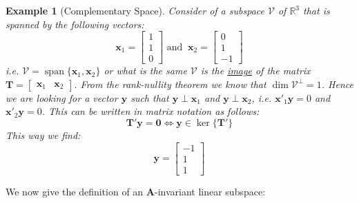 \documentclass[a4paper,10pt,oneside]{book}
\newtheorem{example}{Example}
\begin{document}
\begin{example}[Complementary Space]\label{ex:complSpace}
 Consider of a subspace $\mathcal{V}$ of $\mathbb{R}^3$ that is spanned by the following vectors:
 \begin{equation}
 \mathbf{x}_1=\left[ {\begin{array}{c}
      1\\1\\0
\end{array} } \right] \text{ and }\ \mathbf{x}_2=\left[ {\begin{array}{c}
      0\\1\\-1
\end{array} } \right]
 \end{equation}
i.e. $\mathcal{V}=\operatorname{span}\{\mathbf{x}_1,\mathbf{x}_2\}$ or what is the same $\mathcal{V}$ is the \hyperlink{def:image}{image} of the matrix $\mathbf{T}=\left[ {\begin{array}{cc}\mathbf{x}_1&\mathbf{x}_2\end{array} } \right]$. From the rank-nullity theorem we know that $\operatorname{dim}\mathcal{V}^\perp=1$. Hence we are looking for a vector $\mathbf{y}$ such that $\mathbf{y}\perp\mathbf{x}_1$ and  $\mathbf{y}\perp\mathbf{x}_2$, i.e. $\mathbf{x}'_1\mathbf{y}=0$ and $\mathbf{x}'_2\mathbf{y}=0$. This can be written in matrix notation as follows:
\begin{equation}
 \mathbf{T}'\mathbf{y}=\mathbf{0}\Leftrightarrow\mathbf{y}\in\operatorname{ker}\{\mathbf{T}'\}
\end{equation}
This way we find:
\begin{equation}
 \mathbf{y}=\left[ {\begin{array}{c}
      -1\\1\\1
\end{array} } \right]
\end{equation}
\end{example}

\noindent We now give the definition of an $\mathbf{A}$-invariant linear subspace:
\end{document}

